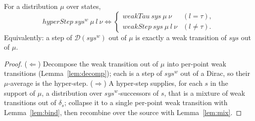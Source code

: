 \begin{lemma}
  \label{lem:hyperstep-weakstep}
  \leanok
  For a distribution $\mu$ over states,
  \[
    hyperStep\ sys^w\ \mu\ l\ \nu
    \iff
    \begin{cases}
      weakTau\ sys\ \mu\ \nu & (l = \tau),\\
      weakStep\ sys\ \mu\ l\ \nu & (l \ne \tau).
    \end{cases}
  \]
  Equivalently: a step of $\mathcal{D}(sys^w)$ out of $\mu$ is exactly a weak transition of $sys$ out of $\mu$.
\end{lemma}

\begin{proof}\leanok
  ($\Leftarrow$) Decompose the weak transition out of $\mu$ into per-point weak transitions (Lemma~\ref{lem:decomp}); each is a step of $sys^w$ out of a Dirac, so their $\mu$-average is the hyper-step.
  ($\Rightarrow$) A hyper-step supplies, for each $s$ in the support of $\mu$, a distribution over $sys^w$-successors of $s$, that is a mixture of weak transitions out of $\delta_s$; collapse it to a single per-point weak transition with Lemma~\ref{lem:bind}, then recombine over the source with Lemma~\ref{lem:mix}.
\end{proof}
